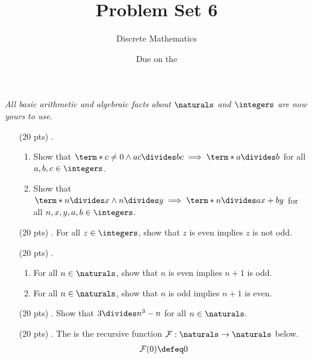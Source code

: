 

\title{Problem Set 6}
\author[Daniel Gonzalez Cedre]{Discrete Mathematics}
\date{Due on the }



\maketitle

\emph{All basic arithmetic and algebraic facts about $\naturals$ and $\integers$ are now yours to use.}


\begin{enumerate}
  \item[(20 pts) \quad 1.]
    \begin{enumerate}
      \item
        Show that $\term*{c \neq 0 \land ac \divides bc} \implies \term*{a \divides b}$ for all $a, b, c \in \integers$.
      \item
        Show that $\term*{n \divides x \land n \divides y} \implies \term*{n \divides ax + by}$ for all $n, x, y, a, b \in \integers$.
    \end{enumerate}
  \item[(20 pts) \quad 2.]
    For all $z \in \integers$, show that $z$ is even implies $z$ is not odd.
  \item[(20 pts) \quad 3.]
    \begin{enumerate}
      \item
        For all $n \in \naturals$, show that $n$ is even implies $n + 1$ is odd.
      \item
        For all $n \in \naturals$, show that $n$ is odd implies $n + 1$ is even.
    \end{enumerate}
  \item[(20 pts) \quad 4.]
    Show that $3 \divides n^3 - n$ for all $n \in \naturals$.%
  \item[(20 pts) \quad 5.]
    The  is the recursive function $\mathcal{F}: \naturals \to \naturals$ below.
    \begin{align*}
        \mathcal{F}(0) &\defeq 0 \\

\end{align*}
\end{enumerate}
